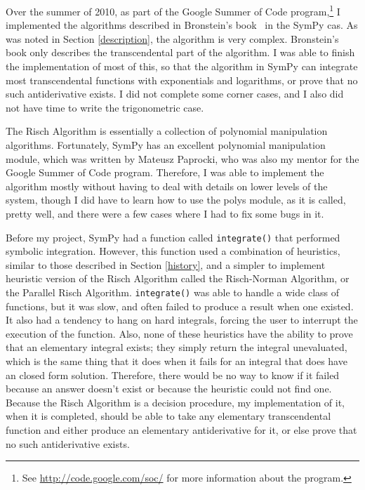 Over the summer of 2010, as part of the Google Summer of Code
program,\footnote{ See \url{http://code.google.com/soc/} for more
information about the program.} I implemented the algorithms described
in Bronstein's book~\cite{bronstein2005symbolic} in the SymPy \gls{cas}.
As was noted in Section \ref{description}, the algorithm is very
complex. Bronstein's book only describes the \gls{transcendental} part
of the algorithm. I was able to finish the implementation of most of
this, so that the algorithm in SymPy can integrate most
\gls{transcendental} functions with exponentials and logarithms, or
prove that no such antiderivative exists.  I did not complete some
corner cases, and I also did not have time to write the trigonometric
case.

The Risch Algorithm is essentially a collection of polynomial
manipulation algorithms.  Fortunately, SymPy has an excellent polynomial
manipulation module, which was written by Mateusz Paprocki, who was also
my mentor for the Google Summer of Code program.  Therefore, I was able
to implement the algorithm mostly without having to deal with details on
lower levels of the system, though I did have to learn how to use the
polys module, as it is called, pretty well, and there were a few cases
where I had to fix some bugs in it.

Before my project, SymPy had a function called \texttt{integrate()} that
performed symbolic \gls{integration}.  However, this function used a
combination of heuristics, similar to those described in Section
\ref{history}, and a simpler to implement heuristic version of the Risch
Algorithm called the Risch-Norman Algorithm, or the Parallel Risch
Algorithm.  \texttt{integrate()} was able to handle a wide class of
functions, but it was slow, and often failed to produce a result when
one existed.  It also had a tendency to hang on hard integrals, forcing
the user to interrupt the execution of the function.  Also, none of
these heuristics have the ability to prove that an \gls{elementary}
integral exists; they simply return the integral unevaluated, which is
the same thing that it does when it fails for an integral that does have
an closed form solution. Therefore, there  would be no way to know if it
failed because an answer doesn't exist or because the heuristic could
not find one.  Because the Risch Algorithm is a decision procedure,
my implementation of it, when it is completed, should be able to take any
\gls{elementary} \gls{transcendental} function and either produce an
\gls{elementary} antiderivative for it, or else prove that no such
antiderivative exists.  

